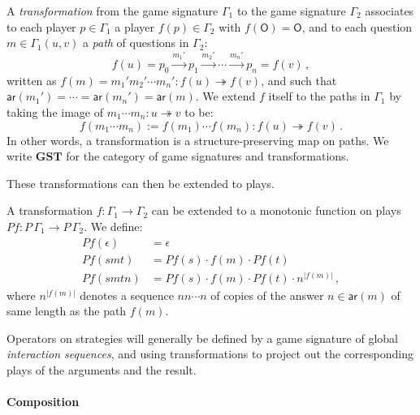 \documentclass[sigplan,10pt,review,anonymous]{acmart}
\newcommand{\kw}[1]{\ensuremath{ \mathsf{#1} }}
\begin{document}
\begin{definition}
A \emph{transformation}
from the game signature $\Gamma_1$
to the game signature $\Gamma_2$
associates to each player $p \in \Gamma_1$ a player $f(p) \in \Gamma_2$
with $f(\kw{O}) = \kw{O}$,
and to each question $m \in \Gamma_1(u,v)$
a \emph{path} of questions in $\Gamma_2$:
\[
  f(u) = p_0 \xrightarrow{m_1'} p_1 \xrightarrow{m_2'} \cdots
             \xrightarrow{m_n'} p_n = f(v) \,,
\]
written as
$f(m) = m_1' m_2' \cdots m_n' : f(u) \twoheadrightarrow f(v)$, and
such that
$\kw{ar}(m_1') = \cdots = \kw{ar}(m_n') = \kw{ar}(m)$.
We extend $f$ itself to the paths in $\Gamma_1$
by taking the image of $m_1 \cdots m_n : u \twoheadrightarrow v$
to be:
\[
  f(m_1 \cdots m_n) := f(m_1) \cdots f(m_n) :
    f(u) \twoheadrightarrow f(v) \,.
\]
In other words,
a transformation
is a structure-preserving map on paths.
We write $\mathbf{GST}$ for the category of
game signatures and transformations.
\end{definition}

These transformations can then be extended to plays.

\begin{definition}
A transformation
$f : \Gamma_1 \rightarrow \Gamma_2$
can be extended to a monotonic function on plays
$P f  : P \, {\Gamma}_1 \rightarrow P \, {\Gamma}_2$.
We define:
\begin{align*}
  P f (\epsilon) &= \epsilon \\
  P f (smt) &= P f (s) \cdot f(m) \cdot P f (t) \\
  P f (smtn) &= P f (s) \cdot f(m) \cdot P f (t) \cdot n^{|f(m)|} \,,
\end{align*}
where $n^{|f(m)|}$ denotes a sequence $nn \cdots n$
of copies of the answer $n \in \kw{ar}(m)$
of same length as the path $f(m)$.
\end{definition}

Operators on strategies will generally be defined
by a game signature of global \emph{interaction sequences},
and using transformations to project out
the corresponding plays of the arguments and the result.

\paragraph{Composition} %
\end{document}
